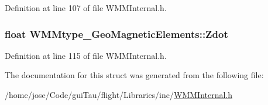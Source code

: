 Definition at line 107 of file W\-M\-M\-Internal.\-h.

\hypertarget{struct_w_m_mtype___geo_magnetic_elements_a094afb05e04f6d9654a1a469987600a6}{
\subsubsection[{Zdot}]{\setlength{\rightskip}{0pt plus 5cm}float W\-M\-Mtype\-\_\-\-Geo\-Magnetic\-Elements\-::\-Zdot}}\label{struct_w_m_mtype___geo_magnetic_elements_a094afb05e04f6d9654a1a469987600a6}


Definition at line 115 of file W\-M\-M\-Internal.\-h.



The documentation for this struct was generated from the following file\-:\begin{DoxyCompactItemize}
\item 
/home/jose/\-Code/gui\-Tau/flight/\-Libraries/inc/\hyperlink{_w_m_m_internal_8h}{W\-M\-M\-Internal.\-h}\end{DoxyCompactItemize}
